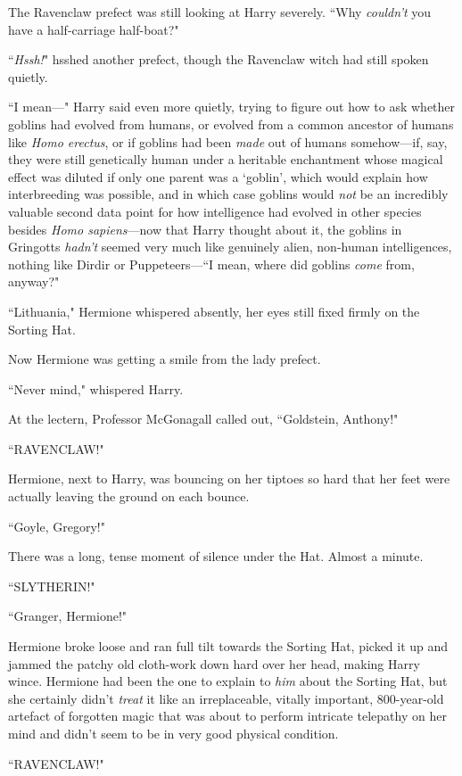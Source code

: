 The Ravenclaw prefect was still looking at Harry severely. ``Why \emph{couldn't} you have a half-carriage half-boat?"

``\emph{Hssh!}" hsshed another prefect, though the Ravenclaw witch had still spoken quietly.

``I mean—" Harry said even more quietly, trying to figure out how to ask whether goblins had evolved from humans, or evolved from a common ancestor of humans like \emph{Homo erectus}, or if goblins had been \emph{made} out of humans somehow—if, say, they were still genetically human under a heritable enchantment whose magical effect was diluted if only one parent was a `goblin', which would explain how interbreeding was possible, and in which case goblins would \emph{not} be an incredibly valuable second data point for how intelligence had evolved in other species besides \emph{Homo sapiens}—now that Harry thought about it, the goblins in Gringotts \emph{hadn't} seemed very much like genuinely alien, non-human intelligences, nothing like Dirdir or Puppeteers—``I mean, where did goblins \emph{come} from, anyway?"

``Lithuania," Hermione whispered absently, her eyes still fixed firmly on the Sorting Hat.

Now Hermione was getting a smile from the lady prefect.

``Never mind," whispered Harry.

At the lectern, Professor McGonagall called out, ``Goldstein, Anthony!"

``RAVENCLAW!"

Hermione, next to Harry, was bouncing on her tiptoes so hard that her feet were actually leaving the ground on each bounce.

``Goyle, Gregory!"

There was a long, tense moment of silence under the Hat. Almost a minute.

``SLYTHERIN!"

``Granger, Hermione!"

Hermione broke loose and ran full tilt towards the Sorting Hat, picked it up and jammed the patchy old cloth-work down hard over her head, making Harry wince. Hermione had been the one to explain to \emph{him} about the Sorting Hat, but she certainly didn't \emph{treat} it like an irreplaceable, vitally important, 800-year-old artefact of forgotten magic that was about to perform intricate telepathy on her mind and didn't seem to be in very good physical condition.

``RAVENCLAW!"

